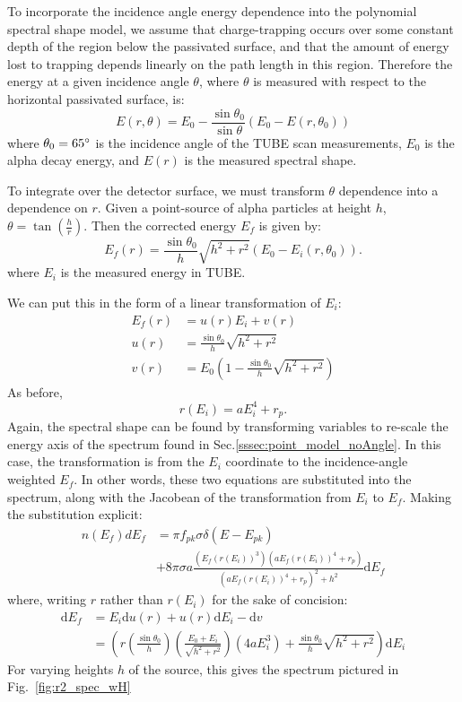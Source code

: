 To incorporate the incidence angle energy dependence into the polynomial spectral shape model, we assume that charge-trapping occurs over some constant depth of the region below the passivated surface, and that the amount of energy lost to trapping depends linearly on the path length in this region. Therefore the energy at a given incidence angle $\theta$, where $\theta$ is measured with respect to the horizontal passivated surface, is:
$$ E(r, \theta) = E_0 - \frac{\sin\theta_0}{\sin\theta}(E_0-E(r, \theta_0))$$
where $\theta_0 = 65\degree$ is the incidence angle of the TUBE scan measurements, $E_0$ is the alpha decay energy, and $E(r)$ is the measured spectral shape.

To integrate over the detector surface, we must transform $\theta$ dependence into a dependence on $r$. Given a point-source of alpha particles at height $h$, $\theta = \tan(\frac{h}{r})$. Then the corrected energy $E_f$ is given by:
$$E_f(r)= \frac{\sin\theta_0}{h} \sqrt{h^2+r^2}(E_0-E_i(r, \theta_0)).$$
where $E_i$ is the measured energy in TUBE. 

We can put this in the form of a linear transformation of $E_i$:
\begin{equation}
\begin{split}
E_f(r) &= u(r)E_i+v(r) \\
u(r) &= \frac{\sin\theta_0}{h}\sqrt{h^2+r^2} \\
v(r) &= E_0(1-\frac{\sin\theta_0}{h}\sqrt{h^2+r^2})
\end{split}
\end{equation}
As before, 
$$ r(E_i) = aE_i^4 +r_p. $$
Again, the spectral shape can be found by transforming variables to re-scale the energy axis of the spectrum found in Sec.\ref{sssec:point_model_noAngle}. In this case, the transformation is from the $E_i$ coordinate to the incidence-angle weighted $E_f$. In other words, these two equations are substituted into the spectrum, along with the Jacobean of the transformation from $E_i$ to $E_f$. 
Making the substitution explicit: 
\begin{equation}
\begin{split}
n(E_f)dE_f &= \pi f_{pk}\sigma\delta(E-E_{pk}) \\
&+ 8\pi \sigma a \frac{(E_f(r(E_i))^3)(aE_f(r(E_i))^4+r_p)}{(aE_f(r(E_i))^4+r_p)^2+h^2} \mathrm{d}E_f
\end{split}
\label{eqn:r2_spec}
\end{equation}
where, writing $r$ rather than $r(E_i)$ for the sake of concision:
\begin{equation}
\begin{split}
\mathrm{d}E_f &= E_i\mathrm{d}u(r)+u(r)\mathrm{d}E_i - \mathrm{d}v \\
&= (r(\frac{\sin\theta_0}{h})(\frac{E_0+E_i}{\sqrt{h^2+r^2}})(4aE_i^3)+\frac{\sin\theta_0}{h}\sqrt{h^2+r^2})\mathrm{d}E_i
\end{split}
\label{eqn:r2_jac}
\end{equation}
For varying heights $h$ of the source, this gives the spectrum pictured in Fig.~\ref{fig:r2_spec_wH}

